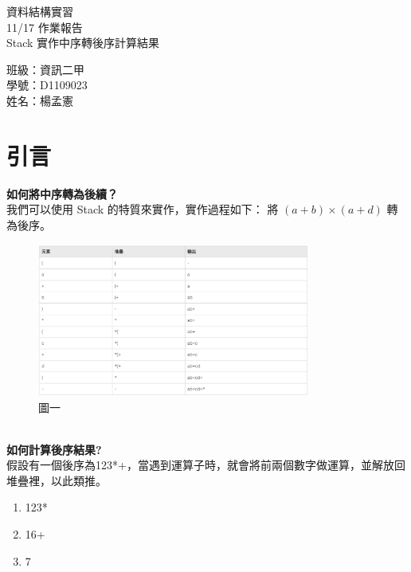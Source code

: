 \documentclass[12pt, a4paper]{article}
\begin{document}
  \begin{center}
    {\Huge 資料結構實習} \\[2.5cm]
    {\Huge 11/17 作業報告} \\[1.5cm]
    {\Huge Stack 實作中序轉後序計算結果} \\ [4.5cm]
    \hspace{.6in}
    \begin{minipage}[t]{.4\linewidth}
      {\Large 班級：資訊二甲}\\[0.5cm]
      {\Large 學號：D1109023}\\[0.5cm]
      {\Large 姓名：楊孟憲}
    \end{minipage}    
  \end{center}

  \newpage

  \begin{samepage}
    \fontsize{16pt}{18pt} \selectfont  
    \tableofcontents
    \normalfont
  \end{samepage}
  
  \newpage


  \section{\fontsize{20pt}{22pt}\selectfont 引言}
  \begin{samepage}
    \fontsize{16pt}{18pt} \selectfont
      \textbf{如何將中序轉為後續？} \\ 
      我們可以使用 Stack 的特質來實作，實作過程如下： 將 $(a + b) \times (a + d)$ 轉為後序。
      \begin{figure}[ht]
        \centering
        \includegraphics[width=0.8\textwidth]{./Image/screenshot01.png}
        \caption{圖一}
      \end{figure}
      \\
      \textbf{如何計算後序結果?} \\
      假設有一個後序為123*+，當遇到運算子時，就會將前兩個數字做運算，並解放回堆疊裡，以此類推。
      \begin{enumerate}
        \item 123*
        \item 16+
        \item 7
      \end{enumerate}
  \end{samepage}
\end{document}
